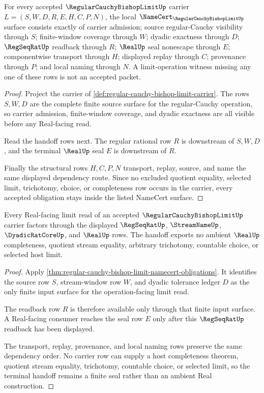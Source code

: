 \begin{theorem}
\label{thm:regular-cauchy-bishop-limit-namecert-obligations}
For every accepted $\RegularCauchyBishopLimitUp$ carrier $L=(S,W,D,R,E,H,C,P,N)$, the local $\NameCert_{\RegularCauchyBishopLimitUp}$ surface consists exactly of carrier admission; source regular-Cauchy visibility through $S$; finite-window coverage through $W$; dyadic exactness through $D$; $\RegSeqRatUp$ readback through $R$; $\RealUp$ seal nonescape through $E$; componentwise transport through $H$; displayed replay through $C$; provenance through $P$; and local naming through $N$. A limit-operation witness missing any one of these rows is not an accepted packet.
\end{theorem}
\begin{proof}
Project the carrier of \autoref{def:regular-cauchy-bishop-limit-carrier}. The rows $S,W,D$ are the complete finite source surface for the regular-Cauchy operation, so carrier admission, finite-window coverage, and dyadic exactness are all visible before any Real-facing read.

Read the handoff rows next. The regular rational row $R$ is downstream of $S,W,D$, and the terminal $\RealUp$ seal $E$ is downstream of $R$.

Finally the structural rows $H,C,P,N$ transport, replay, source, and name the same displayed dependency route. Since no excluded quotient equality, selected limit, trichotomy, choice, or completeness row occurs in the carrier, every accepted obligation stays inside the listed NameCert surface.
\end{proof}

\begin{theorem}
\label{thm:regular-cauchy-bishop-limit-real-seal-handoff}
Every Real-facing limit read of an accepted $\RegularCauchyBishopLimitUp$ carrier factors through the displayed $\RegSeqRatUp$, $\StreamNameUp$, $\DyadicRatCoreUp$, and $\RealUp$ rows. The handoff exports no ambient $\RealUp$ completeness, quotient stream equality, arbitrary trichotomy, countable choice, or selected host limit.
\end{theorem}
\begin{proof}
Apply \autoref{thm:regular-cauchy-bishop-limit-namecert-obligations}. It identifies the source row $S$, stream-window row $W$, and dyadic tolerance ledger $D$ as the only finite input surface for the operation-facing limit read.

The readback row $R$ is therefore available only through that finite input surface. A Real-facing consumer reaches the seal row $E$ only after this $\RegSeqRatUp$ readback has been displayed.

The transport, replay, provenance, and local naming rows preserve the same dependency order. No carrier row can supply a host completeness theorem, quotient stream equality, trichotomy, countable choice, or selected limit, so the terminal handoff remains a finite seal rather than an ambient Real construction.
\end{proof}


